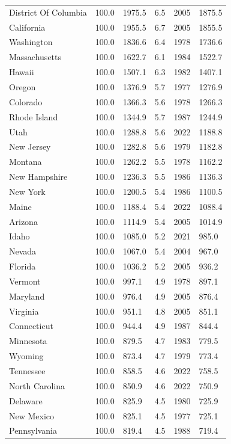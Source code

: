 \begin{longtable}{llllrl}
District Of Columbia & 100.0 & 1975.5 & 6.5 & 2005 & 1875.5 \\
California & 100.0 & 1955.5 & 6.7 & 2005 & 1855.5 \\
Washington & 100.0 & 1836.6 & 6.4 & 1978 & 1736.6 \\
Massachusetts & 100.0 & 1622.7 & 6.1 & 1984 & 1522.7 \\
Hawaii & 100.0 & 1507.1 & 6.3 & 1982 & 1407.1 \\
Oregon & 100.0 & 1376.9 & 5.7 & 1977 & 1276.9 \\
Colorado & 100.0 & 1366.3 & 5.6 & 1978 & 1266.3 \\
Rhode Island & 100.0 & 1344.9 & 5.7 & 1987 & 1244.9 \\
Utah & 100.0 & 1288.8 & 5.6 & 2022 & 1188.8 \\
New Jersey & 100.0 & 1282.8 & 5.6 & 1979 & 1182.8 \\
Montana & 100.0 & 1262.2 & 5.5 & 1978 & 1162.2 \\
New Hampshire & 100.0 & 1236.3 & 5.5 & 1986 & 1136.3 \\
New York & 100.0 & 1200.5 & 5.4 & 1986 & 1100.5 \\
Maine & 100.0 & 1188.4 & 5.4 & 2022 & 1088.4 \\
Arizona & 100.0 & 1114.9 & 5.4 & 2005 & 1014.9 \\
Idaho & 100.0 & 1085.0 & 5.2 & 2021 & 985.0 \\
Nevada & 100.0 & 1067.0 & 5.4 & 2004 & 967.0 \\
Florida & 100.0 & 1036.2 & 5.2 & 2005 & 936.2 \\
Vermont & 100.0 & 997.1 & 4.9 & 1978 & 897.1 \\
Maryland & 100.0 & 976.4 & 4.9 & 2005 & 876.4 \\
Virginia & 100.0 & 951.1 & 4.8 & 2005 & 851.1 \\
Connecticut & 100.0 & 944.4 & 4.9 & 1987 & 844.4 \\
Minnesota & 100.0 & 879.5 & 4.7 & 1983 & 779.5 \\
Wyoming & 100.0 & 873.4 & 4.7 & 1979 & 773.4 \\
Tennessee & 100.0 & 858.5 & 4.6 & 2022 & 758.5 \\
North Carolina & 100.0 & 850.9 & 4.6 & 2022 & 750.9 \\
Delaware & 100.0 & 825.9 & 4.5 & 1980 & 725.9 \\
New Mexico & 100.0 & 825.1 & 4.5 & 1977 & 725.1 \\
Pennsylvania & 100.0 & 819.4 & 4.5 & 1988 & 719.4 \\

\end{longtable}
